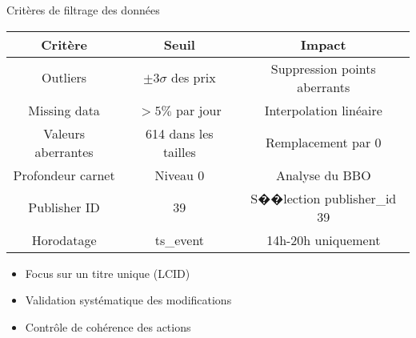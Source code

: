 \documentclass[aspectratio=169]{beamer}  %
\begin{document}
\begin{frame}{Critères de filtrage des données}
    \begin{table}
    \centering
    \begin{tabular}{|c|c|c|}
    \hline
    \textbf{Critère} & \textbf{Seuil} & \textbf{Impact} \\ \hline
    Outliers & $\pm3\sigma$ des prix & Suppression points aberrants \\ \hline
    Missing data & $>5\%$ par jour & Interpolation linéaire \\ \hline
    Valeurs aberrantes & 614 dans les tailles & Remplacement par 0 \\ \hline
    Profondeur carnet & Niveau 0 & Analyse du BBO \\ \hline
    Publisher ID & 39 & S��lection publisher\_id 39 \\ \hline
    Horodatage & ts\_event & 14h-20h uniquement \\ \hline
    \end{tabular}
    \end{table}
    \vspace{0.3cm}
    \begin{itemize}
        \item Focus sur un titre unique (LCID)
        \item Validation systématique des modifications
        \item Contrôle de cohérence des actions
    \end{itemize}
\end{frame}
\end{document}
